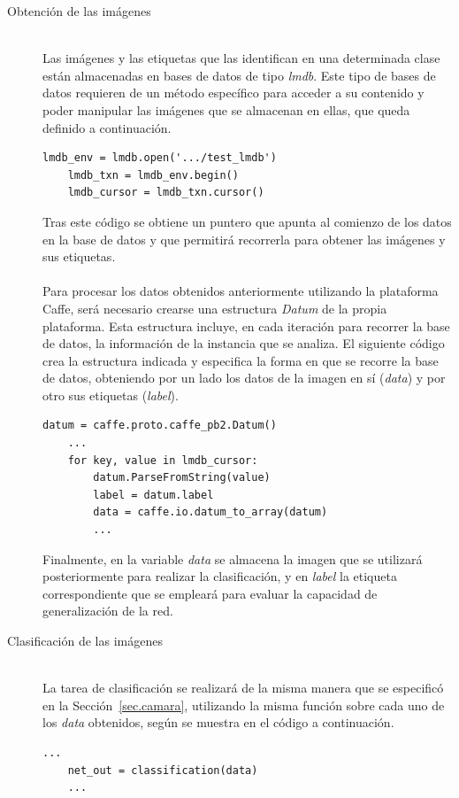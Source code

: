 \begin{description}
	\item[Obtención de las imágenes] \hfill 
	\vspace{5pt}
	\\
	Las imágenes y las etiquetas que las identifican en una determinada clase están almacenadas en bases de datos de tipo \textit{\acrfull{lmdb}}. Este tipo de bases de datos requieren de un método específico para acceder a su contenido y poder manipular las imágenes que se almacenan en ellas, que queda definido a continuación.
	\vspace{10pt}
	\begin{lstlisting}[frame=single]
	lmdb_env = lmdb.open('.../test_lmdb')
	lmdb_txn = lmdb_env.begin()
	lmdb_cursor = lmdb_txn.cursor()
	\end{lstlisting}
	
	Tras este código se obtiene un puntero que apunta al comienzo de los datos en la base de datos y que permitirá recorrerla para obtener las imágenes y sus etiquetas.\\
	\vspace{-10pt}
	\\
	Para procesar los datos obtenidos anteriormente utilizando la plataforma Caffe, será necesario crearse una estructura \textit{Datum} de la propia plataforma. Esta estructura incluye, en cada iteración para recorrer la base de datos, la información de la instancia que se analiza. El siguiente código crea la estructura indicada y especifica la forma en que se recorre la base de datos, obteniendo por un lado los datos de la imagen en sí (\textit{data}) y por otro sus etiquetas (\textit{label}).
	\vspace{10pt}
	\begin{lstlisting}[frame=single]
	datum = caffe.proto.caffe_pb2.Datum()
	...
	for key, value in lmdb_cursor:
		datum.ParseFromString(value)
		label = datum.label
		data = caffe.io.datum_to_array(datum)
		...
	\end{lstlisting}
	
	Finalmente, en la variable \textit{data} se almacena la imagen que se utilizará posteriormente para realizar la clasificación, y en \textit{label} la etiqueta correspondiente que se empleará para evaluar la capacidad de generalización de la red.
	\vspace{5pt}
	\item[Clasificación de las imágenes] \hfill 
	\vspace{5pt}
	\\
	La tarea de clasificación se realizará de la misma manera que se especificó en la Sección~\ref{sec.camara}, utilizando la misma función sobre cada uno de los \textit{data} obtenidos, según se muestra en el código a continuación.
	\vspace{25pt}
	\begin{lstlisting}[frame=single]
	...
	net_out = classification(data)
	...
	\end{lstlisting}
	

\end{description}
